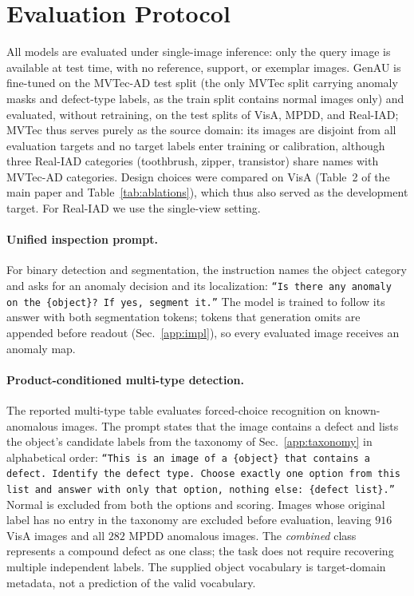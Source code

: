 \section{Evaluation Protocol}
\label{app:eval}
All models are evaluated under single-image inference: only the query image is available at test time, with no reference, support, or exemplar images. GenAU is fine-tuned on the MVTec-AD test split (the only MVTec split carrying anomaly masks and defect-type labels, as the train split contains normal images only) and evaluated, without retraining, on the test splits of VisA, MPDD, and Real-IAD; MVTec thus serves purely as the source domain: its images are disjoint from all evaluation targets and no target labels enter training or calibration, although three Real-IAD categories (toothbrush, zipper, transistor) share names with MVTec-AD categories. Design choices were compared on VisA (Table~2 of the main paper and Table~\ref{tab:ablations}), which thus also served as the development target. For Real-IAD we use the single-view setting.

\paragraph{Unified inspection prompt.}
For binary detection and segmentation, the instruction names the object category and asks for an anomaly decision and its localization: \texttt{``Is there any anomaly on the \{object\}? If yes, segment it.''} The model is trained to follow its answer with both segmentation tokens; tokens that generation omits are appended before readout (Sec.~\ref{app:impl}), so every evaluated image receives an anomaly map.

\paragraph{Product-conditioned multi-type detection.}
The reported multi-type table evaluates forced-choice recognition on known-anomalous images. The prompt states that the image contains a defect and lists the object's candidate labels from the taxonomy of Sec.~\ref{app:taxonomy} in alphabetical order: \texttt{``This is an image of a \{object\} that contains a defect. Identify the defect type. Choose exactly one option from this list and answer with only that option, nothing else: \{defect list\}.''} Normal is excluded from both the options and scoring. Images whose original label has no entry in the taxonomy are excluded before evaluation, leaving $916$ VisA images and all $282$ MPDD anomalous images. The \emph{combined} class represents a compound defect as one class; the task does not require recovering multiple independent labels. The supplied object vocabulary is target-domain metadata, not a prediction of the valid vocabulary.

